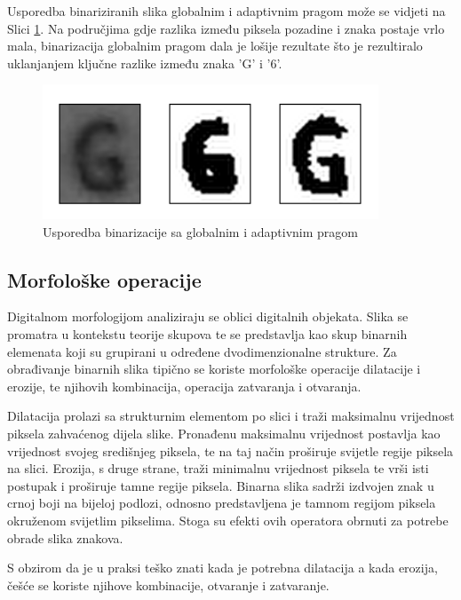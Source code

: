 \documentclass[lmodern, utf8, diplomski, numeric]{fer}
\begin{document}
\hspace{2em}

Usporedba binariziranih slika globalnim i adaptivnim pragom može se vidjeti na Slici \ref{fig:adaglob}. Na područjima gdje razlika između piksela pozadine i znaka postaje vrlo mala, binarizacija globalnim pragom dala je lošije rezultate što je rezultiralo uklanjanjem ključne razlike između znaka 'G' i '6'.  

\begin{figure}[ht!]
\centering
\includegraphics[width=10cm]{slike/thresholding_example.png}
\caption{Usporedba binarizacije sa globalnim i adaptivnim pragom}
\label{fig:adaglob}
\end{figure}


\subsection{Morfološke operacije}

Digitalnom morfologijom analiziraju se oblici digitalnih objekata. Slika se promatra u kontekstu teorije skupova te se predstavlja kao skup binarnih elemenata koji su grupirani u određene dvodimenzionalne strukture. Za obrađivanje binarnih slika tipično se koriste morfološke operacije dilatacije i erozije, te njihovih kombinacija, operacija zatvaranja i otvaranja. 

Dilatacija prolazi sa strukturnim elementom po slici i traži maksimalnu vrijednost piksela zahvaćenog dijela slike. Pronađenu maksimalnu vrijednost postavlja kao vrijednost svojeg središnjeg piksela, te na taj način proširuje svijetle regije piksela na slici.
Erozija, s druge strane, traži minimalnu vrijednost piksela te vrši isti postupak i proširuje tamne regije piksela. Binarna slika sadrži izdvojen znak u crnoj boji na bijeloj podlozi, odnosno predstavljena je tamnom regijom piksela okruženom svijetlim pikselima. Stoga su efekti ovih operatora obrnuti za potrebe obrade slika znakova.  

S obzirom da je u praksi teško znati kada je potrebna dilatacija a kada erozija, češće se koriste njihove kombinacije, otvaranje i zatvaranje.
\end{document}
